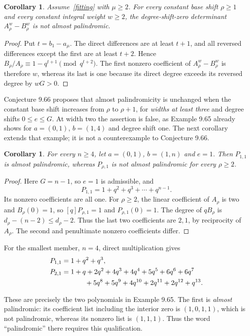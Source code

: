 \documentclass[11pt,a4paper]{article}
\newtheorem{corollary}[theorem]{Corollary}
\begin{document}
\begin{corollary}\label{weighted}
Assume~\eqref{fitting} with $\mu\ge2$. For every constant base shift $\rho\ge1$ and
every constant integral weight $w\ge2$, the degree-shift-zero determinant
$A_\rho^w-B_\rho^w$ is not almost palindromic.
\end{corollary}
\begin{proof}
Put $t=b_1-a_\mu$. The direct differences are at least $t+1$,
and all reversed differences except the first are at least $t+2$.
Hence $B_\rho/A_\rho\equiv1-q^{t+1}\pmod{q^{t+2}}$.
The first nonzero coefficient of $A_\rho^w-B_\rho^w$ is therefore $w$,
whereas its last is one because its direct degree exceeds its reversed
degree by $wG>0$.
\end{proof}

Conjecture 9.66 proposes that almost palindromicity is unchanged when
the constant base shift increases from $\rho$ to $\rho+1$, for
\emph{widths at least three} and degree shifts $0\le e\le G$.
At width two the assertion is false, as Example 9.65 already shows for
$a=(0,1)$, $b=(1,4)$ and degree shift one. The next corollary extends
that example; it is not a counterexample to Conjecture 9.66.

\begin{corollary}\label{counterexample}
For every $n\ge4$, let $a=(0,1)$, $b=(1,n)$ and $e=1$.
Then $P_{1,1}$ is almost palindromic, whereas $P_{\rho,1}$ is not
almost palindromic for every $\rho\ge2$.
\end{corollary}
\begin{proof}
Here $G=n-1$, so $e=1$ is admissible, and
\[
 P_{1,1}=1+q^2+q^3+\cdots+q^{n-1}.
\]
Its nonzero coefficients are all one. For $\rho\ge2$, the linear
coefficient of $A_\rho$ is two and $B_\rho(0)=1$, so
$[q]P_{\rho,1}=1$ and $P_{\rho,1}(0)=1$.
The degree of $qB_\rho$ is $d_\rho-(n-2)\le d_\rho-2$.
Thus the last two coefficients are $2,1$, by reciprocity of $A_\rho$.
The second and penultimate nonzero coefficients differ.
\end{proof}

For the smallest member, $n=4$, direct multiplication gives
\begin{align*}
 P_{1,1}&=1+q^2+q^3,\\
 P_{2,1}&=1+q+2q^2+4q^3+4q^4+5q^5+6q^6+6q^7\\
         &\hspace{12mm}+5q^8+5q^9+4q^{10}+2q^{11}+2q^{12}+q^{13}.
\end{align*}

These are precisely the two polynomials in Example 9.65.
The first is \emph{almost} palindromic: its coefficient list including
the interior zero is $(1,0,1,1)$, which is not palindromic, whereas
its nonzero list is $(1,1,1)$. Thus the word ``palindromic'' there
requires this qualification.
\end{document}
